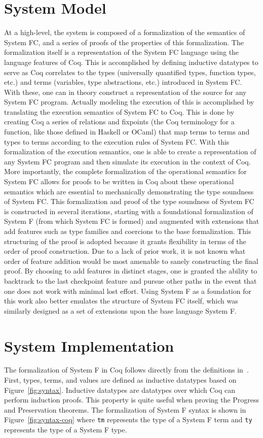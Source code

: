 \documentclass{sig-alternate}
\begin{document}
\section{System Model}
At a high-level, the system is composed of a formalization of the semantics of System FC, and a series of proofs of the properties of this formalization. The formalization itself is a representation of the System FC language using the language features of Coq. This is accomplished by defining inductive datatypes to serve as Coq correlates to the types (universally quantified types, function types, etc.) and terms (variables, type abstractions, etc.) introduced in System FC.  With these, one can in theory construct a representation of the source for any System FC program. Actually modeling the execution of this is accomplished by translating the execution semantics of System FC to Coq. This is done by creating Coq a series of relations and fixpoints (the Coq terminology for a function, like those defined in Haskell or OCaml) that map terms to terms and types to terms according to the execution rules of System FC. With this formalization of the execution semantics, one is able to create a representation of any System FC program and then simulate its execution in the context of Coq. More importantly, the complete formalization of the operational semantics for System FC allows for proofs to be written in Coq about these operational semantics which are essential to mechanically demonstrating the type soundness of System FC.
This formalization and proof of the type soundness of System FC is constructed in several iterations, starting with a foundational formalization of System F (from which System FC is formed) and augmented with extensions that add features such as type families and coercions to the base formalization. This structuring of the proof is adopted because it grants flexibility in terms of the order of proof construction. Due to a lack of prior work, it is not known what order of feature addition would be most amenable to sanely constructing the final proof. By choosing to add features in distinct stages, one is granted the ability to backtrack to the last checkpoint feature and pursue other paths in the event that one does not work with minimal lost effort. Using System F as a foundation for this work also better emulates the structure of System FC itself, which was similarly designed as a set of extensions upon the base language System F.

\section{System Implementation}
The formalization of System F in Coq follows directly from the definitions in~\cite{Pierce:TAPL}. First, types, terms, and values are defined as inductive datatypes based on Figure~\ref{fig:syntax}. Inductive datatypes are datatypes over which Coq can perform induction proofs. This property is quite useful when proving the Progress and Preservation theorems. The formalization of System F syntax is shown in Figure~\ref{fig:syntax-coq} where \texttt{tm} represents the type of a System F term and \texttt{ty} represents the type of a System F type.
\end{document}
